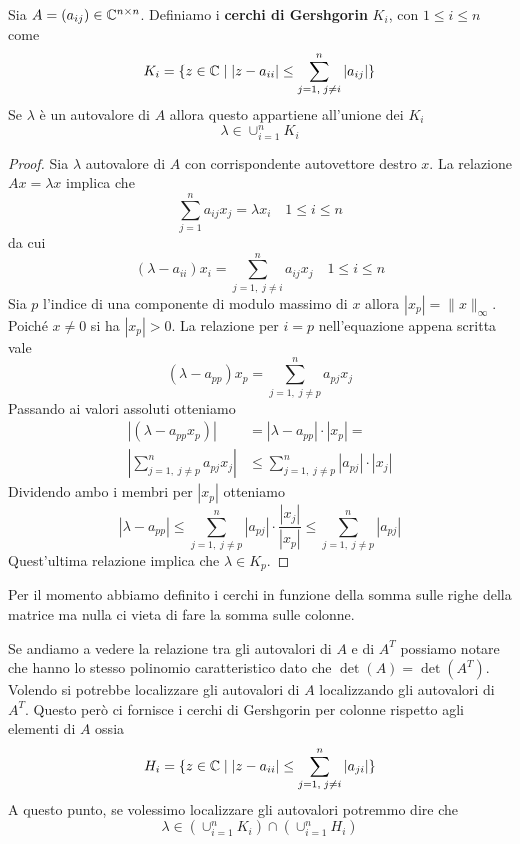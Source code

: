 \begin{theorem}[Gershgorin]
	Sia $A = (a_{ij}) \in \mathbb{C}^{n \times n}$. Definiamo i \textbf{cerchi di Gershgorin} $K_i$, con $1 \leq i \leq n$
	come
	\[ K_i = \{ z \in \mathbb{C} \mid |z - a_{ii}| \leq \sum_{j=1,\;j\neq i}^n |a_{ij}| \} \]
	Se $\lambda$ è un autovalore di $A$ allora questo appartiene all'unione dei $K_i$
	\[ \lambda \in \cup_{i=1}^n K_i \]
	\begin{proof}
		Sia $\lambda$ autovalore di $A$ con corrispondente autovettore destro $x$. La relazione $A x = \lambda x$
		implica che
		\[ \sum_{j=1}^n a_{ij} x_j = \lambda x_i \quad 1 \leq i \leq n \]
		da cui
		\[ (\lambda - a_{ii}) x_i = \sum_{j=1,\; j \neq i}^n a_{ij} x_j \quad 1 \leq i \leq n \]
		Sia $p$ l'indice di una componente di modulo massimo di $x$ allora $|x_p| = \| x \|_\infty$. Poiché
		$x \neq 0$ si ha $|x_p| > 0$. La relazione per $i = p$ nell'equazione appena scritta vale
		\[ (\lambda - a_{pp}) x_p = \sum_{j=1,\; j \neq p}^n a_{pj} x_j \]
		Passando ai valori assoluti otteniamo
		\begin{align*}
			|(\lambda - a_{pp} x_p)|                           &
			= |\lambda - a_{pp}| \cdot |x_p| =                   \\
			\left| \sum_{j=1,\; j \neq p}^n a_{pj} x_j \right| &
			\leq \sum_{j=1,\; j \neq p}^n |a_{pj}| \cdot |x_j|
		\end{align*}
		Dividendo ambo i membri per $|x_p|$ otteniamo
		\[
			|\lambda - a_{pp}| \leq
			\sum_{j=1,\; j \neq p}^n |a_{pj}| \cdot \frac{|x_j|}{|x_p|} \leq
			\sum_{j=1,\; j \neq p}^n |a_{pj}|
		\]
		Quest'ultima relazione implica che $\lambda \in K_p$.
	\end{proof}
\end{theorem}

Per il momento abbiamo definito i cerchi in funzione della somma sulle righe della matrice ma nulla ci vieta di
fare la somma sulle colonne.

Se andiamo a vedere la relazione tra gli autovalori di $A$ e di $A^T$ possiamo notare che hanno lo stesso
polinomio caratteristico dato che $\det(A) = \det(A^T)$. Volendo si potrebbe localizzare gli autovalori di $A$
localizzando gli autovalori di $A^T$. Questo però ci fornisce i cerchi di Gershgorin per colonne rispetto agli
elementi di $A$ ossia
\[ H_i = \{ z \in \mathbb{C} \mid |z - a_{ii}| \leq \sum_{j=1,\;j\neq i}^n |a_{ji}| \} \]
A questo punto, se volessimo localizzare gli autovalori potremmo dire che
\[ \lambda \in \left( \cup_{i=1}^n K_i \right) \cap \left( \cup_{i=1}^n H_i \right) \]